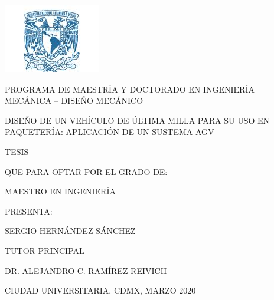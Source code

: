 \begin{center}
\includegraphics[scale=1]{Figures/Logo_azul.png}\\
\vspace*{2\baselineskip}

\textbf{\fontsize{16}{0}{\selectfont{UNIVERSIDAD NACIONAL AUTÓNOMA DE MÉXICO}}}
\vspace*{0\baselineskip}

PROGRAMA DE MAESTRÍA Y DOCTORADO EN INGENIERÍA
MECÁNICA – DISEÑO MECÁNICO

\vspace*{4\baselineskip}

DISEÑO DE UN VEHÍCULO DE ÚLTIMA MILLA PARA SU USO EN PAQUETERÍA: APLICACIÓN DE UN SUSTEMA AGV

\vspace*{5\baselineskip}

TESIS

QUE PARA OPTAR POR EL GRADO DE:

MAESTRO EN INGENIERÍA

\vspace*{5\baselineskip}

PRESENTA:

SERGIO HERNÁNDEZ SÁNCHEZ

\vspace*{4\baselineskip}

TUTOR PRINCIPAL

DR. ALEJANDRO C. RAMÍREZ REIVICH

\vspace*{4\baselineskip}
CIUDAD UNIVERSITARIA, CDMX, MARZO 2020

\thispagestyle{empty}

\end{center}
